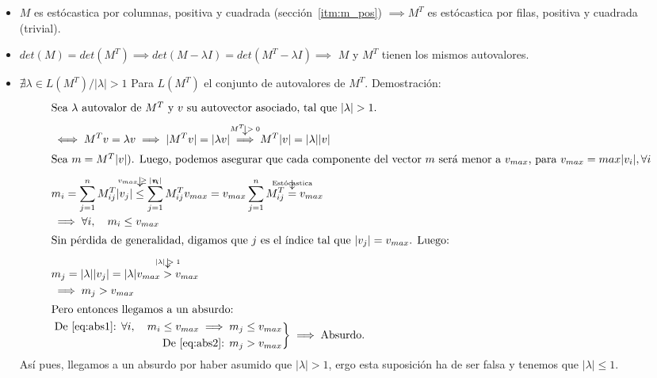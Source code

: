 \smallskip
\begin{itemize}
    \item $M$ es est\'ocastica por columnas, positiva y cuadrada
        (secci\'on~\ref{itm:m_pos}) $\implies M^T$ es est\'ocastica por filas,
        positiva y cuadrada (trivial).\\

    \item $det(M) = det(M^T) \implies det(M-\lambda I) = det(M^T-\lambda I)
        \implies$ $M$ y $M^T$ tienen los mismos autovalores.\\

    \item $\nexists\lambda\in L(M^T) / \left|\lambda\right| > 1$ Para $L(M^T)$
        el conjunto de autovalores de $M^T$. Demostraci\'on:
        \begin{align}
            \intertext{Sea $\lambda$ autovalor de $M^T$ y $v$ su autovector
            asociado, tal que $|\lambda| > 1$.}
            &\iff M^Tv = \lambda v \implies |M^Tv| = |\lambda v|
            \overarrow[\implies][\downarrow]{$M^T > 0$} M^T |v| = |\lambda||v|\\
            \intertext{Sea $m = M^T|v|$). Luego, podemos asegurar que cada
            componente del vector $m$ ser\'a menor a $v_{max}$, para $v_{max}
            = max |v_i|, \forall i$}
            &m_i = \sum_{j=1}^n M^T_{ij} |v_j|
            \overarrow[\leq][\downarrow]{$v_{max}\geq |v_i|$} \sum_{j=1}^n
            M^T_{ij} v_{max} = v_{max}\sum_{j=1}^n M^T_{ij}
            \overarrow[=][\downarrow]{Est\'ocastica} v_{max}\\
            &\implies \forall i,\quad m_i \leq v_{max}\label{eq:abs1}\\
            \intertext{Sin p\'erdida de generalidad, digamos que $j$ es el
            \'indice tal que $|v_j| = v_{max}$. Luego:}
            &m_j = |\lambda||v_j| = |\lambda|v_{max}
            \overarrow[>][\downarrow]{$|\lambda| > 1$} v_{max}\\
            &\implies m_j > v_{max}\label{eq:abs2}\\
            \intertext{Pero entonces llegamos a un absurdo: }
            &\left.\begin{aligned}
                \text{De \ref{eq:abs1}: } \forall i,\quad m_i \leq v_{max}
                    \implies m_j \leq v_{max}\\
                \text{De \ref{eq:abs2}: } m_j > v_{max}\label{eq:dom}
            \end{aligned}\right\} \implies\text{Absurdo}.
        \end{align}
        As\'i pues, llegamos a un absurdo por haber asumido que $|\lambda|>1$,
        ergo esta suposici\'on ha de ser falsa y tenemos que $|\lambda|\leq
        1$.\\


\end{itemize}
